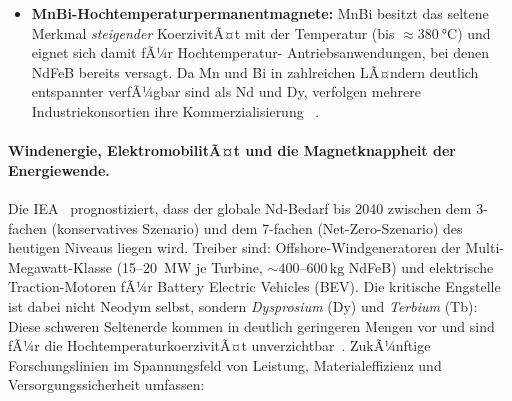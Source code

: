 ﻿\documentclass[12pt, a4paper]{report}
\theoremstyle{definition}
\theoremstyle{remark}
\begin{document}
\begin{itemize}
  \item \textbf{MnBi-Hochtemperaturpermanentmagnete:}
    MnBi besitzt das seltene Merkmal \emph{steigender} KoerzivitÃ¤t mit der
    Temperatur (bis $\approx \SI{380}{\celsius}$) und eignet sich damit fÃ¼r Hochtemperatur-
    Antriebsanwendungen, bei denen NdFeB bereits versagt. Da Mn und Bi in
    zahlreichen LÃ¤ndern deutlich entspannter verfÃ¼gbar sind als Nd und Dy,
    verfolgen mehrere Industriekonsortien ihre Kommerzialisierung ~\cite{lewis2013}.
\end{itemize}

\paragraph{Windenergie, ElektromobilitÃ¤t und die Magnetknappheit der
Energiewende.}
Die IEA~\cite{iea2024} prognostiziert, dass der globale Nd-Bedarf bis 2040
zwischen dem 3-fachen (konservatives Szenario) und dem 7-fachen
(Net-Zero-Szenario) des heutigen Niveaus liegen wird. Treiber sind:
Offshore-Windgeneratoren der Multi-Megawatt-Klasse (15--20~MW je Turbine,
$\sim400$--$600\,\text{kg}$ NdFeB) und elektrische Traction-Motoren fÃ¼r
Battery Electric Vehicles (BEV). Die kritische Engstelle ist dabei nicht
Neodym selbst, sondern \emph{Dysprosium} (Dy) und \emph{Terbium} (Tb): Diese
schweren Seltenerde kommen in deutlich geringeren Mengen vor und sind fÃ¼r
die HochtemperaturkoerzivitÃ¤t unverzichtbar~\cite{alonso2012}. ZukÃ¼nftige
Forschungslinien im Spannungsfeld von Leistung, Materialeffizienz und
Versorgungssicherheit umfassen:
\end{document}
